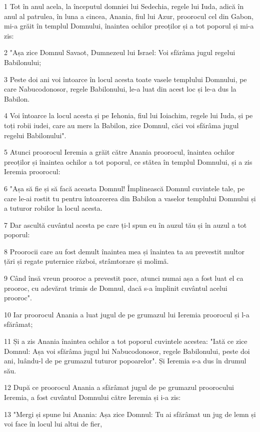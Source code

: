 \par 1 Tot în anul acela, la începutul domniei lui Sedechia, regele lui Iuda, adică în anul al patrulea, în luna a cincea, Anania, fiul lui Azur, proorocul cel din Gabon, mi-a grăit în templul Domnului, înaintea ochilor preoților și a tot poporul și mi-a zis:
\par 2 "Așa zice Domnul Savaot, Dumnezeul lui Israel: Voi sfărâma jugul regelui Babilonului;
\par 3 Peste doi ani voi întoarce în locul acesta toate vasele templului Domnului, pe care Nabucodonosor, regele Babilonului, le-a luat din acest loc și le-a dus la Babilon.
\par 4 Voi întoarce la locul acesta și pe Iehonia, fiul lui Ioiachim, regele lui Iuda, și pe toți robii iudei, care au mers la Babilon, zice Domnul, căci voi sfărâma jugul regelui Babilonului".
\par 5 Atunci proorocul Ieremia a grăit către Anania proorocul, înaintea ochilor preoților și înaintea ochilor a tot poporul, ce stătea în templul Domnului, și a zis Ieremia proorocul:
\par 6 "Așa să fie și să facă aceasta Domnul! Împlinească Domnul cuvintele tale, pe care le-ai rostit tu pentru întoarcerea din Babilon a vaselor templului Domnului și a tuturor robilor la locul acesta.
\par 7 Dar ascultă cuvântul acesta pe care ți-l spun eu în auzul tău și în auzul a tot poporul:
\par 8 Proorocii care au fost demult înaintea mea și înaintea ta au prevestit multor țări și regate puternice război, strâmtorare și molimă.
\par 9 Când însă vreun prooroc a prevestit pace, atunci numai așa a fost luat el ca prooroc, cu adevărat trimis de Domnul, dacă s-a împlinit cuvântul acelui prooroc".
\par 10 Iar proorocul Anania a luat jugul de pe grumazul lui Ieremia proorocul și l-a sfărâmat;
\par 11 Și a zis Anania înaintea ochilor a tot poporul cuvintele acestea: "Iată ce zice Domnul: Așa voi sfărâma jugul lui Nabucodonosor, regele Babilonului, peste doi ani, luându-l de pe grumazul tuturor popoarelor". Și Ieremia s-a dus în drumul său.
\par 12 După ce proorocul Anania a sfărâmat jugul de pe grumazul proorocului Ieremia, a fost cuvântul Domnului către Ieremia și i-a zis:
\par 13 "Mergi și spune lui Anania: Așa zice Domnul: Tu ai sfărâmat un jug de lemn și voi face în locul lui altui de fier,
